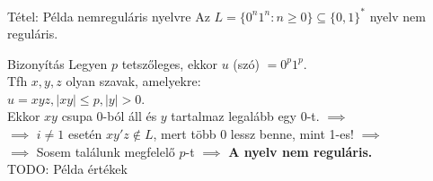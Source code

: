 \documentclass{beamer}
\begin{document}
\begin{frame}
\begin{block}{Tétel: Példa nemreguláris nyelvre}
Az $L = \{0^n1^n : n \geq 0\} \subseteq \{0, 1\}^*$ nyelv nem reguláris.
\end{block}

\begin{block}{Bizonyítás}
Legyen $p$  tetszőleges, ekkor $u$ (szó) $ = 0^p1^p$.\\
Tfh $x, y, z$ olyan szavak, amelyekre:\\
$u = xyz, |xy| \leq p, |y| > 0$.\\
\bigskip
Ekkor $xy$ csupa 0-ból áll és $y$ tartalmaz legalább egy 0-t. $\implies$\\
$\implies$ $i \neq 1$ esetén $xy'z \notin L$, mert több 0 lessz benne, mint 1-es! $\implies$\\
$\implies$ Sosem találunk megfelelő $p$-t $\implies$ \textbf{A nyelv nem reguláris.}\\
\bigskip
TODO: Példa értékek
\end{block}

\end{frame}
\end{document}
